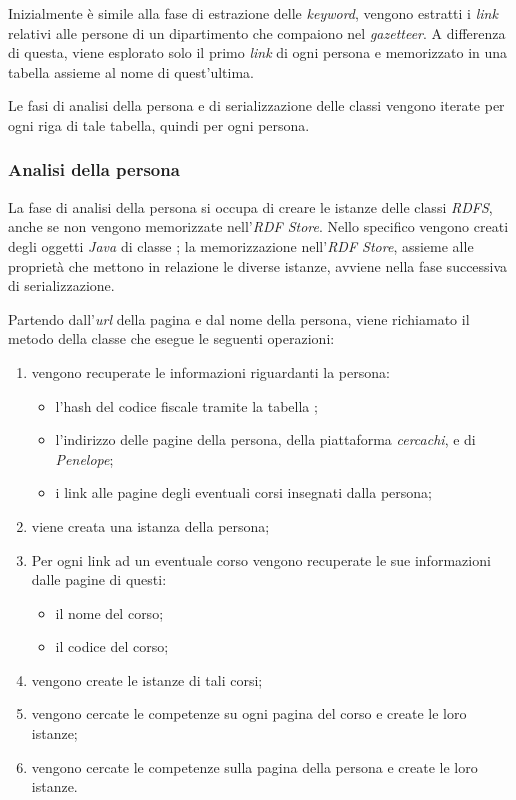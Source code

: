 \documentclass[tesi.tex]{subfiles}
\begin{document}
Inizialmente \`e simile alla fase di estrazione delle \emph{keyword},
vengono estratti i \emph{link} relativi alle persone di un
dipartimento che compaiono nel \emph{gazetteer}. A differenza di
questa, viene esplorato solo il primo \emph{link} di ogni persona e
memorizzato in una tabella assieme al nome di quest'ultima.

Le fasi di analisi della persona e di serializzazione delle classi
vengono iterate per ogni riga di tale tabella, quindi per ogni
persona.

\subsubsection{Analisi della persona}
La fase di analisi della persona si occupa di creare le istanze delle classi
\emph{RDFS}, anche se non vengono memorizzate nell'\emph{RDF
  Store}. Nello specifico vengono creati degli oggetti \emph{Java} di
classe ; la memorizzazione nell'\emph{RDF
  Store}, assieme alle propriet\`a che mettono in relazione le diverse
istanze, avviene nella fase successiva di serializzazione.

 Partendo dall'\emph{url} della pagina e dal nome della
persona, viene richiamato il metodo  della classe
 che esegue le seguenti operazioni:
\begin{enumerate}
\item vengono recuperate le informazioni riguardanti la persona:
  \begin{itemize}
  \item l'hash del codice fiscale tramite la tabella ;
  \item l'indirizzo delle pagine della persona, della piattaforma
    \emph{cercachi}, e di \emph{Penelope};
  \item i link alle pagine degli eventuali corsi insegnati dalla
    persona;
  \end{itemize}
\item viene creata una istanza della persona;
\item Per ogni link ad un eventuale corso vengono recuperate le sue
  informazioni dalle pagine di questi:
  \begin{itemize}
  \item il nome del corso;
  \item il codice del corso;
  \end{itemize}
\item vengono create le istanze di tali corsi;
\item vengono cercate le competenze su ogni pagina del corso e create
  le loro istanze;
\item vengono cercate le competenze sulla pagina della persona e
  create le loro istanze.
\end{enumerate}
\end{document}
